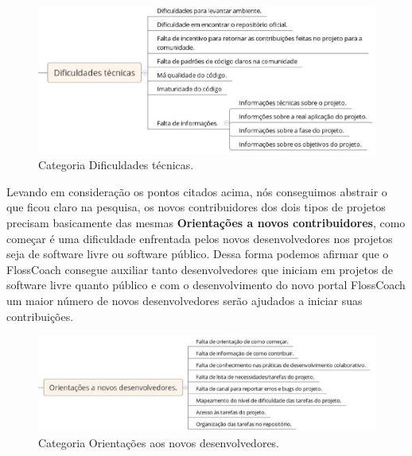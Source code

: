 \begin{figure}[h]
	\centering
	\label{fig:dificuldades}
		\includegraphics[keepaspectratio=true,scale=0.5]{figuras/dificuldades.eps}
	\caption{Categoria Dificuldades técnicas.}
\end{figure}

Levando em consideração os pontos citados acima, nós conseguimos abstrair o que
ficou claro na pesquisa, os novos contribuidores dos dois tipos de projetos precisam
basicamente das mesmas \textbf{Orientações a novos contribuidores}, como começar é 
uma dificuldade enfrentada pelos novos desenvolvedores nos projetos seja de 
software livre ou software público. Dessa forma podemos afirmar que o
FlossCoach consegue auxiliar tanto desenvolvedores que iniciam em projetos de software
livre quanto público e com o desenvolvimento do novo portal FlossCoach um maior
número de novos desenvolvedores serão ajudados a iniciar suas contribuições.

\begin{figure}[h]
	\centering
	\label{fig:orientacoes}
		\includegraphics[keepaspectratio=true,scale=0.5]{figuras/orientacoes.eps}
	\caption{Categoria Orientações aos novos desenvolvedores.}
\end{figure}

